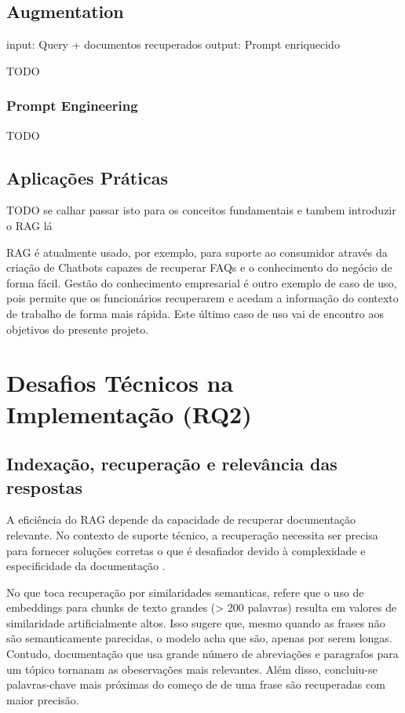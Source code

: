 \subsection{Augmentation}
\label{augmentation}

input: Query + documentos recuperados
output: Prompt enriquecido

TODO

\subsubsection{Prompt Engineering}

TODO

\subsection{Aplicações Práticas}

TODO se calhar passar isto para os conceitos fundamentais e tambem introduzir o RAG lá 

RAG é atualmente usado, por exemplo, para suporte ao consumidor através da criação de Chatbots capazes de recuperar FAQs e o conhecimento do negócio de forma fácil. Gestão do conhecimento empresarial é outro exemplo de caso de uso, pois permite que os funcionários recuperarem e acedam a informação do contexto de trabalho de forma mais rápida. Este último caso de uso vai de encontro aos objetivos do presente projeto. 




\section{Desafios Técnicos na Implementação (RQ2)}


\subsection{Indexação, recuperação e relevância das respostas}

A eficiência do RAG depende da capacidade de recuperar documentação relevante. No contexto de suporte técnico, a recuperação necessita ser precisa para fornecer soluções corretas o que é desafiador devido à complexidade e especificidade da documentação \parencite{ToroIsaza2024}.


No que toca recuperação por similaridades semanticas, \cite{soman2024observations} refere que o uso de embeddings para chunks de texto grandes (> 200 palavras) resulta em valores de similaridade artificialmente altos. Isso sugere que, mesmo quando as frases não são semanticamente parecidas, o modelo acha que são, apenas por serem longas. Contudo, documentação que usa grande número de abreviações e paragrafos para um tópico tornanam as obeservações mais relevantes. Além disso, concluiu-se palavras-chave mais próximas do começo de de uma frase são recuperadas com maior precisão.

